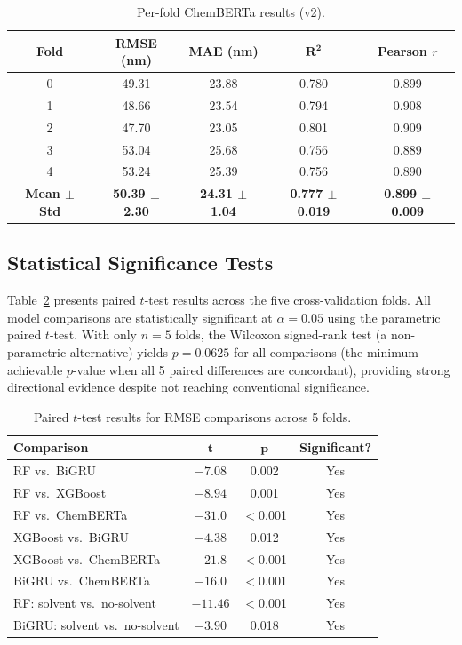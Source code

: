 \documentclass[11pt,a4paper]{article}
\begin{document}
\begin{table}[H]
\centering
\caption{Per-fold ChemBERTa results (v2).}
\label{tab:perfold_chemberta}
\begin{tabular}{ccccc}
\toprule
\textbf{Fold} & \textbf{RMSE (nm)} & \textbf{MAE (nm)} & $\boldsymbol{R^2}$ & \textbf{Pearson $r$} \\
\midrule
0 & 49.31 & 23.88 & 0.780 & 0.899 \\
1 & 48.66 & 23.54 & 0.794 & 0.908 \\
2 & 47.70 & 23.05 & 0.801 & 0.909 \\
3 & 53.04 & 25.68 & 0.756 & 0.889 \\
4 & 53.24 & 25.39 & 0.756 & 0.890 \\
\midrule
\textbf{Mean $\pm$ Std} & \textbf{50.39 $\pm$ 2.30} & \textbf{24.31 $\pm$ 1.04} & \textbf{0.777 $\pm$ 0.019} & \textbf{0.899 $\pm$ 0.009} \\
\bottomrule
\end{tabular}
\end{table}

\subsection{Statistical Significance Tests}
\label{sec:significance}

Table~\ref{tab:significance} presents paired $t$-test results across the five cross-validation folds.
All model comparisons are statistically significant at $\alpha = 0.05$ using the parametric paired $t$-test.
With only $n = 5$ folds, the Wilcoxon signed-rank test (a non-parametric alternative) yields $p = 0.0625$ for all comparisons (the minimum achievable $p$-value when all 5 paired differences are concordant), providing strong directional evidence despite not reaching conventional significance.

\begin{table}[H]
\centering
\caption{Paired $t$-test results for RMSE comparisons across 5 folds.}
\label{tab:significance}
\begin{tabular}{lccc}
\toprule
\textbf{Comparison} & $\boldsymbol{t}$ & $\boldsymbol{p}$ & \textbf{Significant?} \\
\midrule
RF vs.\ BiGRU              & $-7.08$ & 0.002 & Yes \\
RF vs.\ XGBoost            & $-8.94$ & 0.001 & Yes \\
RF vs.\ ChemBERTa          & $-31.0$ & $<$0.001 & Yes \\
XGBoost vs.\ BiGRU         & $-4.38$ & 0.012 & Yes \\
XGBoost vs.\ ChemBERTa     & $-21.8$ & $<$0.001 & Yes \\
BiGRU vs.\ ChemBERTa       & $-16.0$ & $<$0.001 & Yes \\
RF: solvent vs.\ no-solvent  & $-11.46$ & $<$0.001 & Yes \\
BiGRU: solvent vs.\ no-solvent & $-3.90$ & 0.018 & Yes \\
\bottomrule
\end{tabular}
\end{table}
\end{document}
